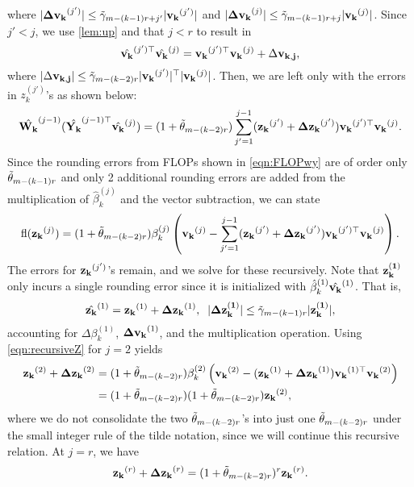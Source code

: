 where $|\mathbf{\Delta v_k}^{(j')}|\leq\tilde{\gamma}_{m-(k-1)r+j'}|\mathbf{v_k}^{(j')}|$ and $|\mathbf{\Delta v_k}^{(j)}|\leq\tilde{\gamma}_{m-(k-1)r+j}|\mathbf{v_k}^{(j)}|$.
Since $j' < j$, we use \cref{lem:up} and that $j<r$ to result in 
$$\hat{\mathbf{v_k}}^{(j')\top}\hat{\mathbf{v_k}}^{(j)} = \mathbf{v_k}^{(j')\top}\mathbf{v_k}^{(j)} + \Delta \mathbf{v_{k,j}},$$
where $|\Delta \mathbf{v_{k,j}}|\leq \tilde{\gamma}_{m-(k-2)r}|\mathbf{v_k}^{(j')}|^{\top}|\mathbf{v_k}^{(j)}|$.
Then, we are left only with the errors in $z_k^{(j')}$'s as shown below:
\begin{equation}
\hat{\mathbf{W_k}}^{(j-1)}(\hat{\mathbf{Y_k}}^{(j-1)\top}\hat{\mathbf{v_k}}^{(j)}) = (1+\tilde{\theta}_{m-(k-2)r})\sum_{j'=1}^{j-1} (\mathbf{z_k}^{(j')} + \mathbf{\Delta z_k}^{(j')})\mathbf{v_k}^{(j')\top}\mathbf{v_k}^{(j)}.
\end{equation}
Since the rounding errors from FLOPs shown in \cref{eqn:FLOPwy} are of order only $\tilde{\theta}_{m-(k-1)r}$ and only 2 additional rounding errors are added from the multiplication of $\hat{\beta}_k^{(j)}$ and the vector subtraction, we can state 
\begin{equation}
\fl(\bb{z_k}^{(j)}) = (1+\tilde{\tth}_{m-(k-2)r})\beta_k^{(j)}\left(\bb{v_k}^{(j)} - \sum_{j'=1}^{j-1} (\bb{z_k}^{(j')} + \bb{\Delta z_k}^{(j')})\bb{v_k}^{(j')\top}\bb{v_k}^{(j)}\right)\label{eqn:recursiveZ}.
\end{equation}
The errors for $\mathbf{z_k}^{(j')}$'s remain, and we solve for these recursively.
Note that $\mathbf{z_k^{(1)}}$ only incurs a single rounding error since it is initialized with $\hat{\beta}_k^{(1)}\hat{\mathbf{v_k}}^{(1)}$.
That is, $$\hat{\mathbf{z_k}}^{(1)}=\mathbf{z_k}^{(1)}+\mathbf{\Delta z_k}^{(1)},\;\; |\mathbf{\Delta z_k^{(1)}}| \leq \tilde{\gamma}_{m-(k-1)r}|\mathbf{z_k^{(1)}}|,$$
accounting for $\Delta\beta_k^{(1)}$, $\mathbf{\Delta v_k}^{(1)}$, and the multiplication operation.
Using \cref{eqn:recursiveZ} for $j=2$ yields 
\begin{align}
\mathbf{z_k}^{(2)} +\mathbf{\Delta z_k}^{(2)}  &= (1+\tilde{\theta}_{m-(k-2)r})\beta_k^{(2)}\left(\mathbf{v_k}^{(2)} -  (\mathbf{z_k}^{(1)} + \mathbf{\Delta z_k}^{(1)})\mathbf{v_k}^{(1)\top}\mathbf{v_k}^{(2)}\right) \\
&=(1+\tilde{\theta}_{m-(k-2)r})(1+\tilde{\theta}_{m-(k-2)r})\mathbf{z_k}^{(2)},
\end{align}
where we do not consolidate the two $\tilde{\theta}_{m-(k-2)r}$'s into just one $\tilde{\theta}_{m-(k-2)r}$ under the small integer rule of the tilde notation, since we will continue this recursive relation. 
At $j=r$, we have 
\begin{equation}
\mathbf{z_k}^{(r)} +\mathbf{\Delta z_k}^{(r)}= (1+\tilde{\theta}_{m-(k-2)r})^r \mathbf{z_k}^{(r)}.
\end{equation}

